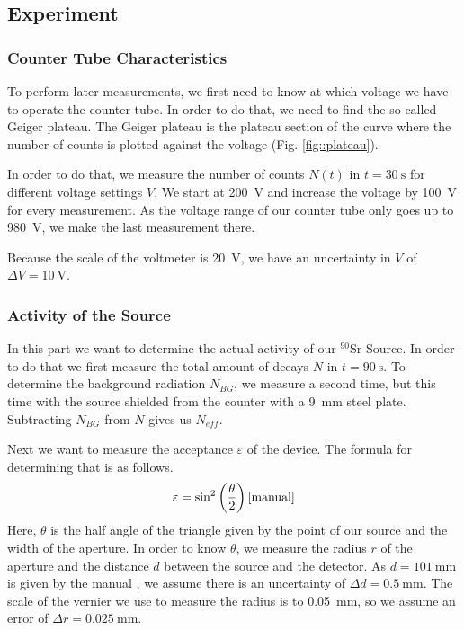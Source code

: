 \subsection{Experiment}

\subsubsection{Counter Tube Characteristics}
To perform later measurements, we first need to know at which voltage we have to operate the counter tube.
In order to do that, we need to find the so called Geiger plateau.
The Geiger plateau is the plateau section of the curve where the number of counts is plotted against the voltage (Fig. \ref{fig::plateau}). 

In order to do that, we measure the number of counts $N(t)$ in $t = \SI{30}{\second}$ for different voltage settings $V$.
We start at \SI{200}{\volt} and increase the voltage by \SI{100}{\volt} for every measurement.
As the voltage range of our counter tube only goes up to \SI{980}{\volt}, we make the last measurement there.

Because the scale of the voltmeter is \SI{20}{\volt}, we have an uncertainty in $V$ of $\Delta V = \SI{10}{\volt}$.

\subsubsection{Activity of the Source}
In this part we want to determine the actual activity of our $^{90}$Sr Source.
In order to do that we first measure the total amount of decays $N$ in $t = \SI{90}{\second}$.
To determine the background radiation $N_{BG}$, we measure a second time, but this time with the source shielded from the counter with a \SI{9}{\milli\meter} steel plate.
Subtracting $N_{BG}$ from $N$ gives us $N_{eff}$.

Next we want to measure the acceptance $\varepsilon$ of the device.
The formula for determining that is as follows.
\begin{align}
	\varepsilon = \sin^2\left(\frac{\theta}{2}\right) \cite{manual}
	\label{eq::acceptance}
\end{align}
Here, $\theta$ is the half angle of the triangle given by the point of our source and the width of the aperture.
In order to know $\theta$, we measure the radius $r$ of the aperture and the distance $d$ between the source and the detector.
As $d = \SI{101}{\milli\meter}$ is given by the manual \cite{manual}, we assume there is an uncertainty of $\Delta d = \SI{0.5}{\milli\meter}$.
The scale of the vernier we use to measure the radius is to \SI{0.05}{\milli\meter}, so we assume an error of $\Delta r = \SI{0.025}{\milli\meter}$.
